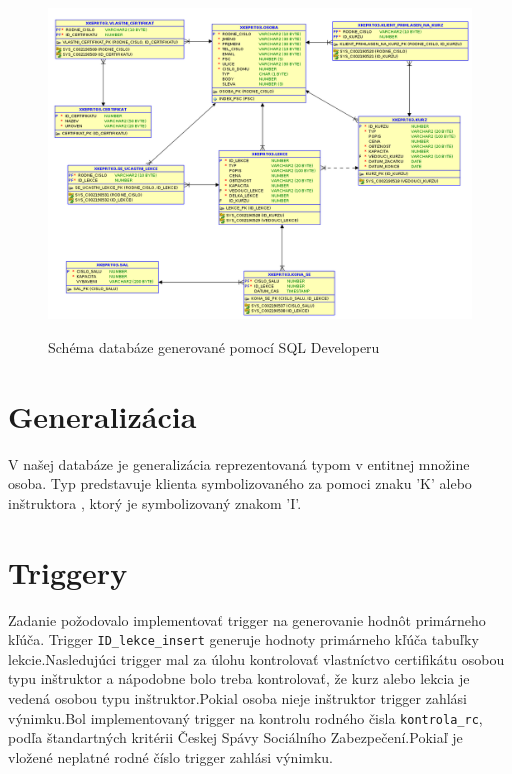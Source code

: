 \documentclass[11pt]{article}
\begin{document}
\begin{figure}[ht]
    \caption{Schéma databáze generované pomocí SQL Developeru}    
    \includegraphics[scale=.538]{schema_DB.png}    
    \label{lopata}
\end{figure}
\restoregeometry

\section{Generalizácia}
V našej databáze je generalizácia reprezentovaná typom v entitnej množine osoba.
Typ predstavuje klienta symbolizovaného za pomoci znaku 'K' alebo inštruktora , ktorý je symbolizovaný
znakom 'I'. 

\section{Triggery}
Zadanie požodovalo implementovať trigger na generovanie hodnôt primárneho kľúča. Trigger \texttt{ID\_lekce\_insert} generuje hodnoty primárneho kľúča tabuľky lekcie.Nasledujúci trigger mal za úlohu kontrolovať vlastníctvo certifikátu osobou typu inštruktor a nápodobne bolo treba kontrolovať, že kurz alebo lekcia je vedená osobou typu inštruktor.Pokial osoba nieje inštruktor trigger zahlási výnimku.Bol implementovaný trigger na kontrolu rodného čisla \texttt{kontrola\_rc}, podľa štandartných kritérii Českej Spávy Sociálního Zabezpečení.Pokiaľ je vložené neplatné rodné číslo trigger zahlási výnimku. 
\end{document}
